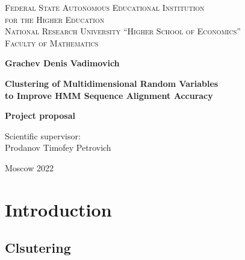 \documentclass[a4paper, 12pt]{article}
\theoremstyle{definition}
\theoremstyle{definition}
\theoremstyle{remark}
\begin{document}
\begin{center}
{\scshape Federal State Autonomous Educational Institution\\
for the Higher Education\\
National Research University ``Higher School of Economics''\\[1ex]
Faculty of Mathematics\par}

\par\vfill

\textbf{\large Grachev Denis Vadimovich}

\vspace{1.5cm}

{\Large\bfseries
Clustering of Multidimensional Random Variables \\ to Improve HMM Sequence Alignment Accuracy
\par}

\vspace{1.5cm}

\textbf{\large Project proposal}

\vspace{1cm}

\par\vfill
\noindent\parbox[t]{0.48\textwidth}{%
Scientific supervisor:\\[3pt]
Prodanov Timofey Petrovich
}
\par\vfill\vfill
Moscow 2022
\end{center}
\thispagestyle{empty}
\pagebreak

\tableofcontents
\newpage
\section{Introduction}
\subsection{Clsutering}
\end{document}

